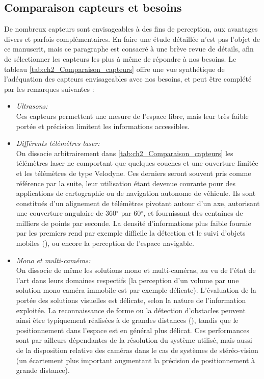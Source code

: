 \subsection{Comparaison capteurs et besoins}
De nombreux capteurs sont envisageables à des fins de perception, aux avantages divers et parfois complémentaires. En faire une étude détaillée n'est pas l'objet de ce manuscrit, mais ce paragraphe est consacré à une brève revue de détails, afin de sélectionner les capteurs les plus à même de répondre à nos besoins. Le tableau \ref{tab:ch2_Comparaison_capteurs} offre une vue synthétique de l'adéquation des capteurs envisageables avec nos besoins, et peut être complété par les remarques suivantes :
\begin{itemize}
\item{\emph{Ultrasons:\\}}
Ces capteurs permettent une mesure de l'espace libre, mais leur très faible portée et précision limitent les informations accessibles.\\

\item{\emph{Différents télémètres laser:\\}}
On dissocie arbitrairement dans \ref{tab:ch2_Comparaison_capteurs} les télémètres laser ne comportant que quelques couches et une ouverture limitée et les télémètres de type \og Velodyne\fg{}. Ces derniers seront souvent pris comme référence par la suite, leur utilisation étant devenue courante pour des applications de cartographie ou de navigation autonome de véhicule. Ils sont constitués d'un alignement de télémètres pivotant autour d'un axe, autorisant une couverture angulaire de 360$^\circ$ par 60$^\circ$, et fournissant des centaines de milliers de points par seconde. La densité d'informations plus faible fournie par les premiers rend par exemple difficile la détection et le suivi d'objets mobiles (\cite{Wang2007, Gate2009}), ou encore la perception de l'espace navigable.\\

\item{\emph{Mono et multi-caméras:\\}}
On dissocie de même les solutions mono et multi-caméras, au vu de l'état de l'art dans leurs domaines respectifs (la perception d'un volume par une solution mono-caméra immobile est par exemple délicate). L'évaluation de la portée des solutions visuelles est délicate, selon la nature de l'information exploitée. La reconnaissance de forme ou la détection d'obstacles peuvent ainsi être typiquement réalisées à de grandes distances (\cite{Labayrade2002}), tandis que le positionnement dans l'espace est en général plus délicat. Ces performances sont par ailleurs dépendantes de la résolution du système utilisé, mais aussi de la disposition relative des caméras dans le cas de systèmes de stéréo-vision (un écartement plus important augmentant la précision de positionnement à grande distance). \\


\end{itemize}

